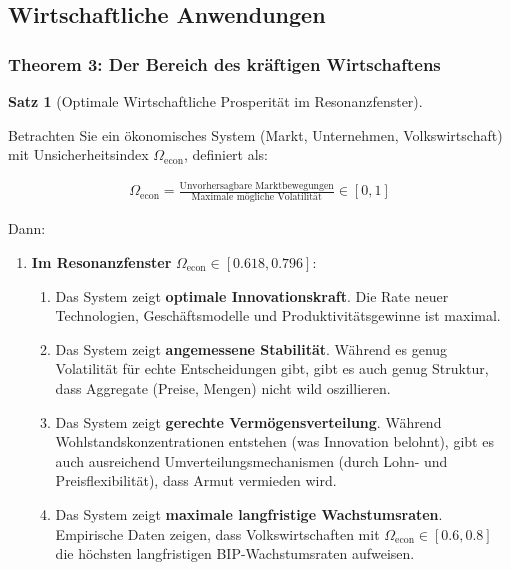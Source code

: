 \documentclass[a4paper, 12pt, twoside, openright]{report}
\theoremstyle{definition}
\theoremstyle{definition}
\newtheorem{satz}{Satz}[chapter]
\begin{document}
\subsection{Wirtschaftliche Anwendungen}

\subsubsection*{Theorem 3: Der Bereich des kräftigen Wirtschaftens}

\begin{satz}[Optimale Wirtschaftliche Prosperität im Resonanzfenster]
\label{satz:economic_flourishing}

Betrachten Sie ein ökonomisches System (Markt, Unternehmen, Volkswirtschaft) mit Unsicherheitsindex $\Omega_{\text{econ}}$, definiert als:

\begin{align}
\Omega_{\text{econ}} = \frac{\text{Unvorhersagbare Marktbewegungen}}{\text{Maximale mögliche Volatilität}} \in [0, 1]
\end{align}

Dann:

\begin{enumerate}
	\item \textbf{Im Resonanzfenster} $\Omega_{\text{econ}} \in [0.618, 0.796]$:
	
	\begin{enumerate}
		\item Das System zeigt \textbf{optimale Innovationskraft}. Die Rate neuer Technologien, Geschäftsmodelle und Produktivitätsgewinne ist maximal.
		
		\item Das System zeigt \textbf{angemessene Stabilität}. Während es genug Volatilität für echte Entscheidungen gibt, gibt es auch genug Struktur, dass Aggregate (Preise, Mengen) nicht wild oszillieren.
		
		\item Das System zeigt \textbf{gerechte Vermögensverteilung}. Während Wohlstandskonzentrationen entstehen (was Innovation belohnt), gibt es auch ausreichend Umverteilungsmechanismen (durch Lohn- und Preisflexibilität), dass Armut vermieden wird.
		
		\item Das System zeigt \textbf{maximale langfristige Wachstumsraten}. Empirische Daten zeigen, dass Volkswirtschaften mit $\Omega_{\text{econ}} \in [0.6, 0.8]$ die höchsten langfristigen BIP-Wachstumsraten aufweisen.
	\end{enumerate}
	

\end{enumerate}
\end{satz}
\end{document}

